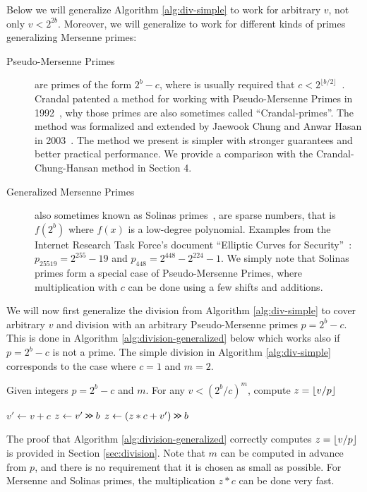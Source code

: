 Below we will generalize Algorithm \ref{alg:div-simple} to work for
arbitrary $v$, not only $v<2^{2b}$. Moreover, we will generalize
to work for different kinds of primes generalizing Mersenne primes:
\begin{description}
	\item[Pseudo-Mersenne Primes]
	      are primes of the form $2^b-c$, where is usually required that $c < 2^{\lfloor b/2\rfloor}$~\cite{van2014encyclopedia}.
	      Crandal patented a method for working with Pseudo-Mersenne Primes in 1992~\cite{crandall1992method},
	      why those primes are also sometimes called ``Crandal-primes''.
	      The method was formalized and extended by Jaewook Chung and Anwar Hasan in 2003~\cite{chung2003more}. The method we present is simpler with
	      stronger guarantees and better practical performance.
	      We provide a comparison with the Crandal-Chung-Hansan method in Section 4.
	\item[Generalized Mersenne Primes]
	      also sometimes known as Solinas primes~\cite{Solinas2011}, are sparse numbers, that is $f(2^b)$ where $f(x)$ is a low-degree polynomial.
	      Examples from the Internet Research Task Force's document ``Elliptic Curves for Security''~\cite{rfc7748}:
	      $p_{25519} = 2^{255} - 19$
	      and
	      $p_{448} = 2^{448}-2^{224}-1$.
	      We simply note that Solinas primes form a special case of
	      Pseudo-Mersenne Primes, where multiplication with $c$
	      can be done using a few shifts and additions.
\end{description}
We will now first generalize the division from Algorithm \ref{alg:div-simple} to cover arbitrary $v$ and division with an arbitrary Pseudo-Mersenne primes $p=2^b-c$.
This is done in Algorithm \ref{alg:division-generalized} below which
works also if $p=2^b-c$ is not a prime.  The
simple division in Algorithm \ref{alg:div-simple} corresponds to the case
where $c=1$ and $m=2$.
\begin{algorithm}[H]
	\caption{Given integers $p=2^b-c$ and $m$.
		For any $v< (2^b/c)^m$, compute $z=\lfloor {v/p} \rfloor$}
	\label{alg:division-generalized}
	\begin{algorithmic}
		\State $v' \gets v + c$
		\State $z \gets v' \mathbin{\texttt{>\!>}} b$
		\State $z \gets (z * c + v')\mathbin{\texttt{>\!>}} b$
		\EndFor
	\end{algorithmic}
\end{algorithm}
The proof that Algorithm \ref{alg:division-generalized} correctly computes
$z=\lfloor {v/p} \rfloor$ is provided in Section \ref{sec:division}.
Note that $m$ can be computed in advance from $p$, and there is no requirement that it is chosen as small as possible.
For Mersenne and Solinas primes, the multiplication $z*c$ can be done very fast.

